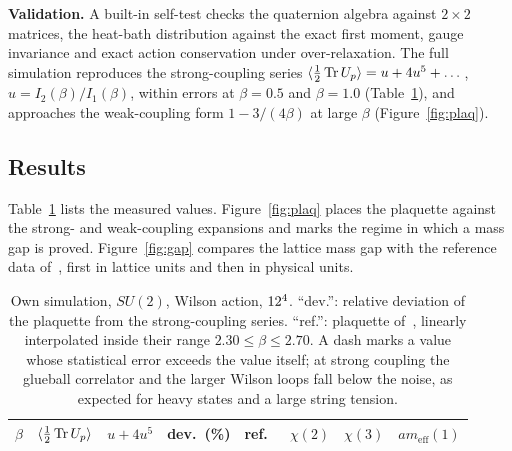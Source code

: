 \documentclass[11pt,a4paper]{article}
\begin{document}
\textbf{Validation.} A built-in self-test checks the quaternion algebra against $2\times2$ matrices, the heat-bath distribution against the exact first moment, gauge invariance and exact action conservation under over-relaxation. The full simulation reproduces the strong-coupling series $\langle\tfrac12\operatorname{Tr} U_p\rangle=u+4u^5+\dots$, $u=I_2(\beta)/I_1(\beta)$, within errors at $\beta=0.5$ and $\beta=1.0$ (Table~\ref{tab:lab}), and approaches the weak-coupling form $1-3/(4\beta)$ at large $\beta$ (Figure~\ref{fig:plaq}). 

\subsection{Results}
Table~\ref{tab:lab} lists the measured values. Figure~\ref{fig:plaq} places the plaquette against the strong- and weak-coupling expansions and marks the regime in which a mass gap is proved. Figure~\ref{fig:gap} compares the lattice mass gap with the reference data of~\cite{AT21}, first in lattice units and then in physical units.

\begin{table}[h]
\centering\small
\begin{tabular}{@{}llllllll@{}}
\toprule
$\beta$ & $\langle\frac12\operatorname{Tr} U_p\rangle$ & $u+4u^5$ & dev.\ (\%) & ref.~\cite{AT21} & $\chi(2)$ & $\chi(3)$ & $am_{\mathrm{eff}}(1)$\\
\midrule

\end{tabular}
\caption{Own simulation, $SU(2)$, Wilson action, $12^4$. \enquote{dev.}: relative deviation of the plaquette from the strong-coupling series. \enquote{ref.}: plaquette of~\cite{AT21}, linearly interpolated inside their range $2.30\le\beta\le2.70$. A dash marks a value whose statistical error exceeds the value itself; at strong coupling the glueball correlator and the larger Wilson loops fall below the noise, as expected for heavy states and a large string tension.}\label{tab:lab}
\end{table}
\end{document}
